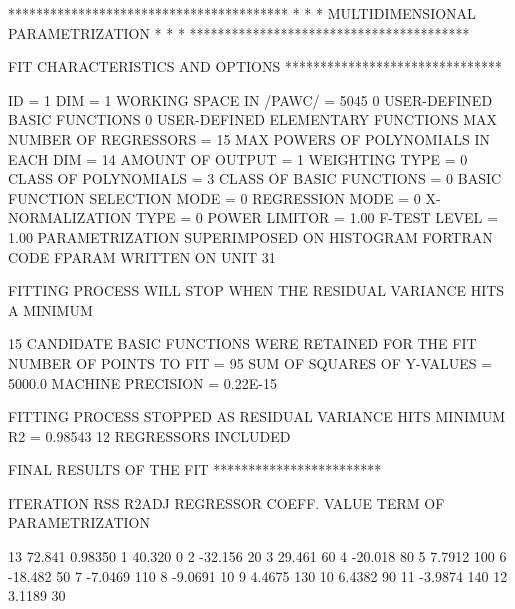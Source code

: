 \begin{Listing}
{\scriptsize

 ****************************************
 *                                      *
 *   MULTIDIMENSIONAL PARAMETRIZATION   *
 *                                      *
 ****************************************

 FIT CHARACTERISTICS AND OPTIONS
 *******************************

 ID =   1
 DIM =  1
 WORKING SPACE IN /PAWC/ =    5045
  0 USER-DEFINED BASIC FUNCTIONS
  0 USER-DEFINED ELEMENTARY FUNCTIONS
 MAX NUMBER OF REGRESSORS = 15
 MAX POWERS OF POLYNOMIALS IN  EACH DIM = 14  
 AMOUNT OF OUTPUT = 1
 WEIGHTING TYPE = 0
 CLASS OF POLYNOMIALS = 3
 CLASS OF BASIC FUNCTIONS = 0
 BASIC FUNCTION SELECTION MODE = 0
 REGRESSION MODE = 0
 X-NORMALIZATION TYPE = 0
 POWER LIMITOR =  1.00
 F-TEST LEVEL =   1.00
 PARAMETRIZATION SUPERIMPOSED ON HISTOGRAM
 FORTRAN CODE FPARAM WRITTEN ON UNIT 31

 FITTING PROCESS WILL STOP WHEN THE RESIDUAL VARIANCE HITS A MINIMUM

  15 CANDIDATE BASIC FUNCTIONS WERE RETAINED FOR THE FIT
 NUMBER OF POINTS TO FIT =    95
 SUM OF SQUARES OF Y-VALUES =   5000.0    
 MACHINE PRECISION =  0.22E-15


 FITTING PROCESS STOPPED AS RESIDUAL VARIANCE HITS MINIMUM
 R2 =  0.98543      12 REGRESSORS INCLUDED

 FINAL RESULTS OF THE FIT
 ************************

 ITERATION       RSS       R2ADJ     REGRESSOR  COEFF. VALUE   TERM OF PARAMETRIZATION

    13        72.841       0.98350       1        40.320         0 
                                         2       -32.156        20 
                                         3        29.461        60 
                                         4       -20.018        80 
                                         5        7.7912       100 
                                         6       -18.482        50 
                                         7       -7.0469       110 
                                         8       -9.0691        10 
                                         9        4.4675       130 
                                        10        6.4382        90 
                                        11       -3.9874       140 
                                        12        3.1189        30 

}
\end{Listing}
